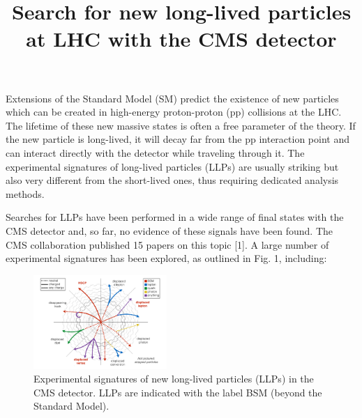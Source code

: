 \documentclass[twocolumn,twoside,10pt,nodate]{article}
\newcommand{\titolo}[2]{\title{\Large\bf\vspace{-1cm}#1}}
\begin{document}

\titolo{Search for new long-lived particles at LHC with the CMS detector}

\date{}%
\maketitle
\thispagestyle{fancy} %

Extensions of the Standard Model (SM) predict the existence of new
particles which can be created in high-energy proton-proton (pp) 
collisions at the LHC. The lifetime of these new massive states is
often a free parameter of the theory. 
If the new particle is long-lived, it will decay far from the pp
interaction point and can interact directly with the detector while
traveling through it. The experimental signatures of long-lived
particles (LLPs) are usually striking but also very different from 
the short-lived ones, thus requiring dedicated analysis methods.

Searches for LLPs have been performed in a
wide range of final states with the CMS detector 
and, so far, no evidence of these signals have been found.
The CMS collaboration published 
15 papers on this topic [1]. A large number of experimental 
signatures has been explored, as outlined in Fig. 1, including:

\begin{figure}[h]
\centering
\includegraphics[width=0.45\textwidth,angle=0]{santanastasio_fig1.pdf}
\caption{\small Experimental signatures of new long-lived particles (LLPs) 
in the CMS detector. LLPs are indicated with the label BSM (beyond the Standard Model).} %
\end{figure}
\end{document}
